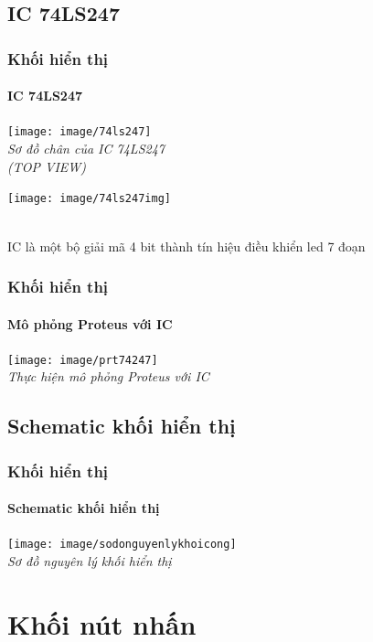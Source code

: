 \documentclass[12pt,a4paper]{beamer}
\begin{document}
\subsection{IC 74LS247}
\begin{frame}
	\frametitle{Khối hiển thị}
	\framesubtitle{IC 74LS247}
	
	\begin{minipage}{7cm}
		\begin{center}
			\texttt{[image: image/74ls247]}\\
			\textit{ Sơ đồ chân của IC 74LS247\\
				(TOP VIEW)}
		\end{center}
	\end{minipage}
	\hfill
	\begin{minipage}{4cm}
		\begin{flushleft}
			\texttt{[image: image/74ls247img]}
		\end{flushleft}
	\end{minipage}
\vspace{0.2cm}\\
IC là một bộ giải mã 4 bit thành tín hiệu điều khiển led 7 đoạn
\end{frame}


\begin{frame}
	\frametitle{Khối hiển thị}
	\framesubtitle{Mô phỏng Proteus với IC}
	\begin{center}
		\texttt{[image: image/prt74247]}\\
		\textit{Thực hiện mô phỏng Proteus với IC}
	\end{center}
\end{frame}

\subsection{Schematic khối hiển thị}

\begin{frame}
	\frametitle{Khối hiển thị}
	\framesubtitle{Schematic khối hiển thị}
	
	\begin{center}
		\texttt{[image: image/sodonguyenlykhoicong]}\\
		\textit{Sơ đồ nguyên lý khối hiển thị}
	\end{center}
\end{frame}

\section{Khối nút nhấn}
\end{document}
